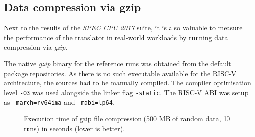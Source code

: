 \subsection{Data compression via gzip}
Next to the results of the \textit{SPEC CPU 2017} suite, it is also valuable to measure the performance of the translator in real-world workloads by running data compression via \textit{gzip}.

The native \textit{gzip} binary for the reference runs was obtained from the default package repositories.
As there is no such executable available for the RISC-V architecture, the sources had to be manually compiled.
The compiler optimisation level \texttt{-O3} was used alongside the linker flag \texttt{-static}.
The RISC-V ABI was setup as \texttt{-march=rv64ima} and \texttt{-mabi=lp64}.

\begin{figure}[h]
	\centering
	\caption[Execution time of gzip compression (500 MB, 10 runs)]%
	{Execution time of gzip file compression (500 MB of random data, 10 runs) in seconds (lower is better).}
	\label{fig:gzip-execution-time}
\end{figure}

